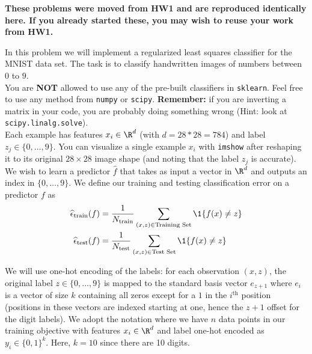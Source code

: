\documentclass{article}
\begin{document}
\textbf{These problems were moved from HW1 and are reproduced identically here. If you already started these, you may wish to reuse your work from HW1.}
\begin{aprob}
    In this problem we will implement a regularized least squares classifier for the MNIST data set. The task
    is to classify handwritten images of numbers between $0$ to $9$.\\
    
    You are \textbf{NOT} allowed to use any of the pre-built  classifiers in \verb|sklearn|.  Feel free to use any method from \verb|numpy| or \verb|scipy|. {\bf Remember:} if you are inverting a matrix in your code, you are probably doing something wrong (Hint: look at \verb|scipy.linalg.solve|).\\

    Each example has features $x_i \in \R^d$ (with $d=28*28=784$) and label $z_j \in \{0,\dots,9\}$. You can visualize a single example $x_i$ with \texttt{imshow} after reshaping it to its original $28 \times 28$ image shape (and noting that the label $z_j$ is accurate). We wish to learn a predictor $\widehat{f}$ that takes as input a vector in $\R^d$ and outputs an index in $\{0,\dots,9\}$. We define our training and testing classification error on a predictor $f$ as
    \begin{align*}
        \widehat{\epsilon}_{\textrm{train}}(f) &=
        \frac{1}{N _{\textrm{train}}} \sum_{(x,z)\in \textrm{Training Set}}     \1\{ f(x) \neq z \}
        \\
          \widehat{\epsilon}_{\textrm{test}}(f) &=
          \frac{1}{N _{\textrm{test}}} \sum_{(x,z)\in \textrm{Test Set}}     \1\{ f(x) \neq z \} 
    \end{align*}
    
    We will use one-hot encoding of the labels: for each observation $(x,z)$, the original label $z \in \{0, \ldots, 9\}$ is mapped to the standard basis vector $e_{z+1}$ where $e_i$ is a vector of size $k$ containing all zeros except for a $1$ in the $i^{\textrm{th}}$ position (positions in these vectors are indexed starting at one, hence the $z+1$ offset for the digit labels). We adopt the notation where we have $n$ data points in our training objective with features $x_i \in \R^d$ and label one-hot encoded as $y_i \in \{0,1\}^k$. Here, $k=10$ since there are 10 digits.
    

\end{aprob}
\end{document}
